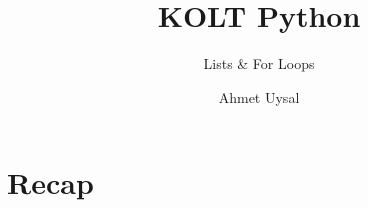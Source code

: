 
\usepackage{../KU-Beamer-Template/style/koc} 
\usepackage{minted}
\usepackage{upquote}
\usepackage{graphicx}


\title{KOLT Python}
\subtitle{Lists \& For Loops} 
\date{}
\author{Ahmet Uysal}


\makeatletter
\let\@@magyar@captionfix\relax
\makeatother

    \maketitle


    \section{Recap}

